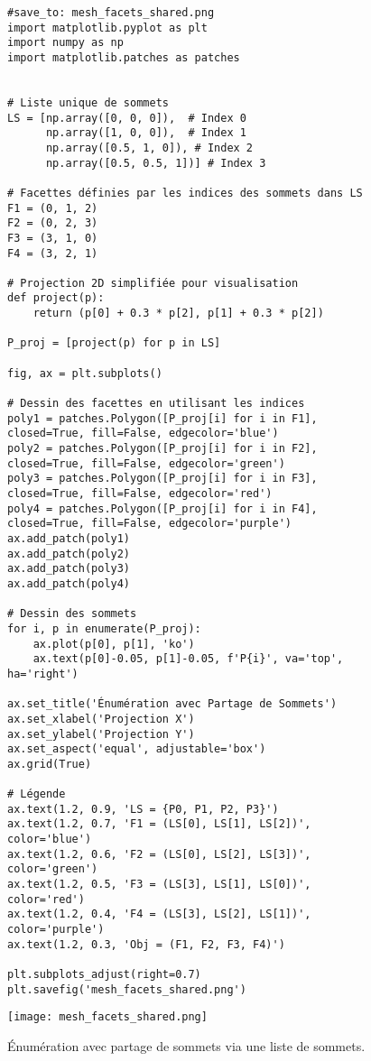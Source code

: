 \documentclass{article}
\begin{document}
\begin{figure}[H]
    \centering
    \begin{verbatim}
#save_to: mesh_facets_shared.png
import matplotlib.pyplot as plt
import numpy as np
import matplotlib.patches as patches


# Liste unique de sommets
LS = [np.array([0, 0, 0]),  # Index 0
      np.array([1, 0, 0]),  # Index 1
      np.array([0.5, 1, 0]), # Index 2
      np.array([0.5, 0.5, 1])] # Index 3

# Facettes définies par les indices des sommets dans LS
F1 = (0, 1, 2)
F2 = (0, 2, 3)
F3 = (3, 1, 0)
F4 = (3, 2, 1)

# Projection 2D simplifiée pour visualisation
def project(p):
    return (p[0] + 0.3 * p[2], p[1] + 0.3 * p[2])

P_proj = [project(p) for p in LS]

fig, ax = plt.subplots()

# Dessin des facettes en utilisant les indices
poly1 = patches.Polygon([P_proj[i] for i in F1], closed=True, fill=False, edgecolor='blue')
poly2 = patches.Polygon([P_proj[i] for i in F2], closed=True, fill=False, edgecolor='green')
poly3 = patches.Polygon([P_proj[i] for i in F3], closed=True, fill=False, edgecolor='red')
poly4 = patches.Polygon([P_proj[i] for i in F4], closed=True, fill=False, edgecolor='purple')
ax.add_patch(poly1)
ax.add_patch(poly2)
ax.add_patch(poly3)
ax.add_patch(poly4)

# Dessin des sommets
for i, p in enumerate(P_proj):
    ax.plot(p[0], p[1], 'ko')
    ax.text(p[0]-0.05, p[1]-0.05, f'P{i}', va='top', ha='right')

ax.set_title('Énumération avec Partage de Sommets')
ax.set_xlabel('Projection X')
ax.set_ylabel('Projection Y')
ax.set_aspect('equal', adjustable='box')
ax.grid(True)

# Légende
ax.text(1.2, 0.9, 'LS = {P0, P1, P2, P3}')
ax.text(1.2, 0.7, 'F1 = (LS[0], LS[1], LS[2])', color='blue')
ax.text(1.2, 0.6, 'F2 = (LS[0], LS[2], LS[3])', color='green')
ax.text(1.2, 0.5, 'F3 = (LS[3], LS[1], LS[0])', color='red')
ax.text(1.2, 0.4, 'F4 = (LS[3], LS[2], LS[1])', color='purple')
ax.text(1.2, 0.3, 'Obj = (F1, F2, F3, F4)')

plt.subplots_adjust(right=0.7)
plt.savefig('mesh_facets_shared.png')
    \end{verbatim}
    \texttt{[image: mesh\_facets\_shared.png]}
    \caption{Énumération avec partage de sommets via une liste de sommets.}
    \label{fig:mesh_facets_shared}
\end{figure}
\end{document}
